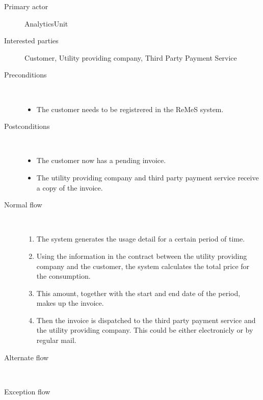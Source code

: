 \begin{description}
	\item[Primary actor] AnalyticsUnit
	\item[Interested parties] Customer, Utility providing company, Third Party
	Payment Service
	\item[Preconditions] \ 
	\begin{itemize}
		\item The customer needs to be registrered in the ReMeS system.
	\end{itemize}
	\item[Postconditions] \ 
	\begin{itemize}
		\item The customer now has a pending invoice.
		\item The utility providing company and third party payment service receive a
		copy of the invoice.
	\end{itemize}
	\item[Normal flow] \ 
	\begin{enumerate}
	  	\item The system generates the usage detail for a certain period of time.
	  	\item Using the information in the contract between the utility providing
	  	company and the customer, the system calculates the total price for the
	  	consumption.
	  	\item This amount, together with the start and end date of the period, makes
	  	up the invoice.
	  	\item Then the invoice is dispatched to the third party payment
	  	service and the utility providing company. This could be either electronicly
	  	or by regular mail.
	\end{enumerate}
	\item[Alternate flow] \ 
	\begin{description}
		\item 
	\end{description}
	\item[Exception flow] \ 
	\begin{description}
		\item 
	\end{description}
\end{description}